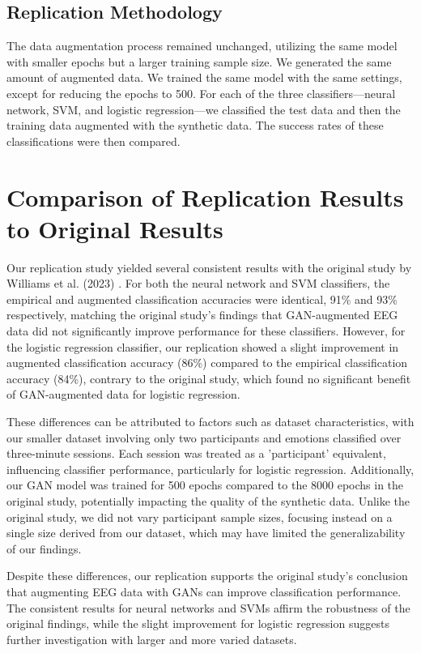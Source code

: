\documentclass[10pt,letterpaper]{article}
\begin{document}
\subsection{Replication Methodology}
The data augmentation process remained unchanged, utilizing the same model with smaller epochs but a larger training sample size. We generated the same amount of augmented data. We trained the same model with the same settings, except for reducing the epochs to 500. For each of the three classifiers—neural network, SVM, and logistic regression—we classified the test data and then the training data augmented with the synthetic data. The success rates of these classifications were then compared. 

\section{Comparison of Replication Results to Original Results}
Our replication study yielded several consistent results with the original study by Williams et al. (2023) \cite{originalpaper}. For both the neural network and SVM classifiers, the empirical and augmented classification accuracies were identical, 91\% and 93\% respectively,  matching the original study's findings that GAN-augmented EEG data did not significantly improve performance for these classifiers. However, for the logistic regression classifier, our replication showed a slight improvement in augmented classification accuracy (86\%) compared to the empirical classification accuracy (84\%), contrary to the original study, which found no significant benefit of GAN-augmented data for logistic regression.

These differences can be attributed to factors such as dataset characteristics, with our smaller dataset involving only two participants and emotions classified over three-minute sessions. Each session was treated as a 'participant' equivalent, influencing classifier performance, particularly for logistic regression. Additionally, our GAN model was trained for 500 epochs compared to the 8000 epochs in the original study, potentially impacting the quality of the synthetic data. Unlike the original study, we did not vary participant sample sizes, focusing instead on a single size derived from our dataset, which may have limited the generalizability of our findings.

Despite these differences, our replication supports the original study's conclusion that augmenting EEG data with GANs can improve classification performance. The consistent results for neural networks and SVMs affirm the robustness of the original findings, while the slight improvement for logistic regression suggests further investigation with larger and more varied datasets.
\end{document}
